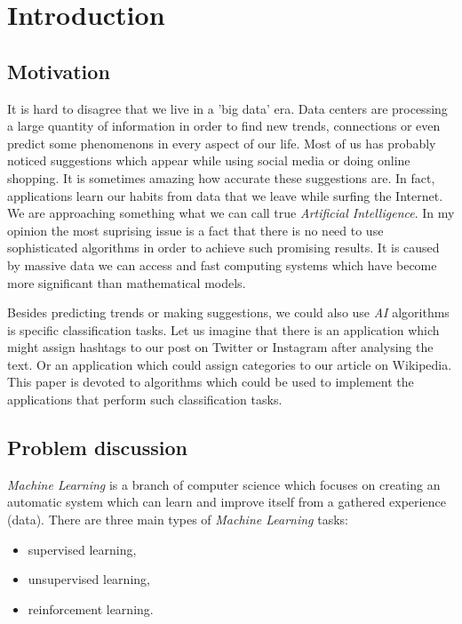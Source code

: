 
\chapter{Introduction}

\section{Motivation}

It is hard to disagree that we live in a 'big data' era. Data centers are processing a large quantity of information in order to find new trends, connections or even predict some phenomenons in every aspect of our life. Most of us has probably noticed suggestions which appear while using social media or doing online shopping. It is sometimes amazing how accurate these suggestions are. In fact, applications learn our habits from data that we leave while surfing the Internet. We are approaching something what we can call true \textit{Artificial Intelligence}. In my opinion the most suprising issue is a fact that there is no need to use sophisticated algorithms in order to achieve such promising results. It is caused by massive data we can access and fast computing systems which have become more significant than mathematical models. 

Besides predicting trends or making suggestions, we could also use \textit{AI} algorithms is specific classification tasks. Let us imagine that there is an application which might assign hashtags to our post on Twitter or Instagram after analysing the text. Or an application which could assign categories to our article on Wikipedia. This paper is devoted to algorithms which could be used to implement the applications that perform such classification tasks. 

\section{Problem discussion}

\textit{Machine Learning} is a branch of computer science which focuses on creating an automatic system which can learn and improve itself from a gathered experience (data). There are three main types of \textit{Machine Learning} tasks:

\begin{itemize}
\item supervised learning,
\item unsupervised learning,
\item reinforcement learning.
\end{itemize}

